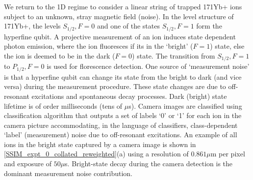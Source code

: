 We return to the 1D regime to consider a linear string of trapped 171Yb+ ions subject to an unknown, stray magnetic field (noise). In the level structure of 171Yb+, the levels $S_{1/2}, F=0$  and one of the states $S_{1/2}, F=1$ form the hyperfine qubit. A projective measurement of an ion induces state dependent photon emission, where the ion fluoresces if its in the `bright' ($F=1$) state, else the ion is deemed to be in the dark ($F=0$) state. The transition from $S_{1/2}, F=1$ to $P_{1/2}, F=0$ is used for florescence detection. One source of `measurement noise' is that a hyperfine qubit can change its state from the bright to dark (and vice versa) during the measurement procedure. These state changes are due to off-resonant excitations and spontaneous decay processes. Dark (bright) state lifetime is of order milliseconds (tens of $\mu$s). Camera images are classified using classification algorithm that outputs a set of labels `0' or `1' for each ion in the camera picture accommodating, in the language of classifiers, class-dependent `label' (measurement) noise due to off-resonant excitations. An example of all ions in the bright state captured by a camera image is shown in \cref{SSIM_expt_0_collated_reweighted}(a) using a resolution of $0.861 \mu$m per pixel and exposure of $50 \mu$s. Bright-state decay during the camera detection is the dominant measurement noise contribution.  

